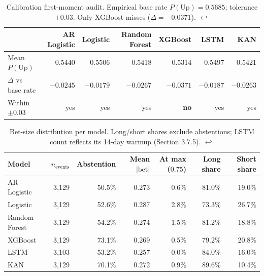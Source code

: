 \documentclass[11pt,a4paper,oneside]{article}
\begin{document}
\begin{table}[H]
\centering
\scriptsize
\setlength{\tabcolsep}{4pt}
\renewcommand{\arraystretch}{0.9}
\begin{tabular}{lrrrrrr}
\toprule
 & AR Logistic & Logistic & Random Forest & XGBoost & LSTM & KAN \\
\midrule
Mean $P(\text{Up})$           & 0.5440    & 0.5506    & 0.5418    & 0.5314    & 0.5497    & 0.5421    \\
$\Delta$ vs base rate         & $-0.0245$ & $-0.0179$ & $-0.0267$ & $-0.0371$ & $-0.0187$ & $-0.0263$ \\
Within $\pm 0.03$             & yes       & yes       & yes       & \textbf{no} & yes     & yes       \\
\bottomrule
\end{tabular}
\caption{Calibration first-moment audit. Empirical base rate $P(\text{Up}) = 0.5685$; tolerance $\pm 0.03$. Only XGBoost misses ($\Delta = -0.0371$). \hyperref[ref:calibration_audit_call]{$\hookleftarrow$}}
\label{tab:calibration_audit}
\end{table}

\begin{table}[H]
\centering
\scriptsize
\setlength{\tabcolsep}{4pt}
\renewcommand{\arraystretch}{0.9}
\begin{tabular}{lrrrrrr}
\toprule
Model & $n_{\text{events}}$ & Abstention & Mean $|\text{bet}|$ & At max ($0.75$) & Long share & Short share \\
\midrule
AR Logistic   & 3{,}129 & 50.5\% & 0.273 & 0.6\% & 81.0\% & 19.0\% \\
Logistic      & 3{,}129 & 52.6\% & 0.287 & 2.8\% & 73.3\% & 26.7\% \\
Random Forest & 3{,}129 & 54.2\% & 0.274 & 1.5\% & 81.2\% & 18.8\% \\
XGBoost       & 3{,}129 & 73.1\% & 0.269 & 0.5\% & 79.2\% & 20.8\% \\
LSTM          & 3{,}103 & 53.2\% & 0.257 & 0.0\% & 84.0\% & 16.0\% \\
KAN           & 3{,}129 & 70.1\% & 0.272 & 0.9\% & 89.6\% & 10.4\% \\
\bottomrule
\end{tabular}
\caption{Bet-size distribution per model. Long/short shares exclude abstentions; LSTM count reflects its 14-day warmup (Section 3.7.5). \hyperref[ref:bet_size_call]{$\hookleftarrow$}}
\label{tab:bet_size}
\end{table}
\end{document}

